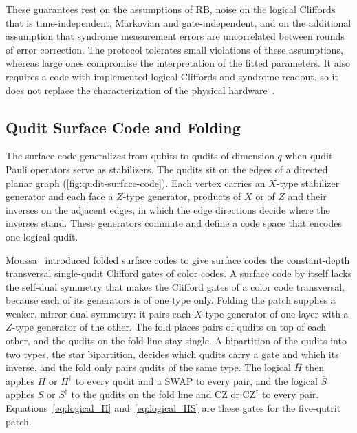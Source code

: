 These guarantees rest on the assumptions of RB, noise on the logical Cliffords that is time-independent, Markovian and gate-independent, and on the additional assumption that syndrome measurement errors are uncorrelated between rounds of error correction. The protocol tolerates small violations of these assumptions, whereas large ones compromise the interpretation of the fitted parameters. It also requires a code with implemented logical Cliffords and syndrome readout, so it does not replace the characterization of the physical hardware~\cite{Combes2017}.

\subsection{Qudit Surface Code and Folding}
\label{sec: qudit surface code}\label{app:background-folded}

The surface code generalizes from qubits to qudits of dimension $q$ when qudit Pauli operators serve as stabilizers. The qudits sit on the edges of a directed planar graph (\autoref{fig:qudit-surface-code}). Each vertex carries an $X$-type stabilizer generator and each face a $Z$-type generator, products of $X$ or of $Z$ and their inverses on the adjacent edges, in which the edge directions decide where the inverses stand. These generators commute and define a code space that encodes one logical qudit.


Moussa~\cite{Moussa2016} introduced folded surface codes to give surface codes the constant-depth transversal single-qudit Clifford gates of color codes. A surface code by itself lacks the self-dual symmetry that makes the Clifford gates of a color code transversal, because each of its generators is of one type only. Folding the patch supplies a weaker, mirror-dual symmetry: it pairs each $X$-type generator of one layer with a $Z$-type generator of the other. The fold places pairs of qudits on top of each other, and the qudits on the fold line stay single. A bipartition of the qudits into two types, the star bipartition, decides which qudits carry a gate and which its inverse, and the fold only pairs qudits of the same type. The logical $\bar H$ then applies $H$ or $H^\dagger$ to every qudit and a SWAP to every pair, and the logical $\bar S$ applies $S$ or $S^\dagger$ to the qudits on the fold line and CZ or $\mathrm{CZ}^\dagger$ to every pair. Equations~\eqref{eq:logical_H} and~\eqref{eq:logical_HS} are these gates for the five-qutrit patch.

